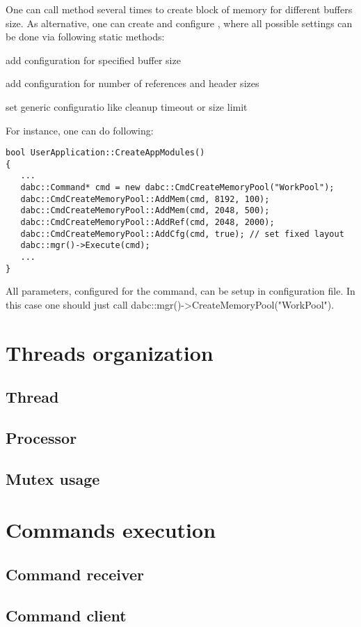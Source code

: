 One can call  method several times to create 
block of memory for different buffers size. As alternative, one can create and 
configure , where all possible settings can be 
done via following static methods:
\bbul
\item[\func{AddMem()}] add configuration for specified buffer size 
\item[\func{AddRef()}] add configuration for number of references and header sizes 
\item[\func{AddCfg()}] set generic configuratio like cleanup timeout or size limit 
\ebul

For instance, one can do following:

\begin{small}
\begin{verbatim}     
bool UserApplication::CreateAppModules()
{
   ...
   dabc::Command* cmd = new dabc::CmdCreateMemoryPool("WorkPool");
   dabc::CmdCreateMemoryPool::AddMem(cmd, 8192, 100);
   dabc::CmdCreateMemoryPool::AddMem(cmd, 2048, 500);
   dabc::CmdCreateMemoryPool::AddRef(cmd, 2048, 2000);
   dabc::CmdCreateMemoryPool::AddCfg(cmd, true); // set fixed layout
   dabc::mgr()->Execute(cmd);
   ...
}
\end{verbatim}     
\end{small}

All parameters, configured for the command, can be setup in configuration file.
In this case one should just call dabc::mgr()->CreateMemoryPool("WorkPool").


\section{Threads organization}

\subsection{Thread}

\subsection{Processor}

\subsection{Mutex usage}


\section{Commands execution}

\subsection{Command receiver}

\subsection{Command client}
